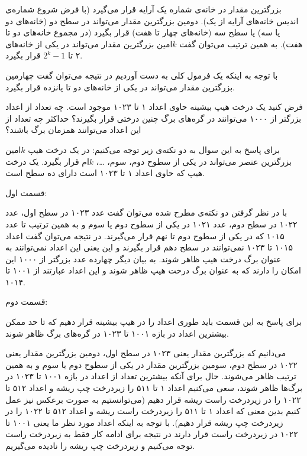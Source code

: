 بزرگترین مقدار در خانه‌ی شماره یک آرایه قرار می‌گیرد (با فرض شروع شماره‌ی اندیس خانه‌های آرایه از یک). دومین بزرگترین مقدار می‌تواند در سطح دو (خانه‌های دو یا سه) یا سطح سه (خانه‌های چهار تا هفت) قرار بگیرد (در مجموع خانه‌های دو تا هفت). به همین ترتیب می‌توان گفت {$k$}امین بزرگترین مقدار می‌تواند در یکی از خانه‌های ۲ تا {$2^k-1$} قرار بگیرد.

با توجه به اینکه یک فرمول کلی به دست آوردیم در نتیجه می‌توان گفت چهارمین بزرگترین مقدار می‌تواند در یکی از خانه‌های دو تا پانزده قرار بگیرد.

 فرض کنید یک درخت هیپ  بیشینه حاوی اعداد ۱ تا ۱۰۲۳ موجود است. چه تعداد از اعداد بزرگتر از ۱۰۰۰ می‌توانند در گره‌های برگ چنین درختی قرار بگیرند؟ حداکثر چه تعداد از این اعداد می‌توانند همزمان برگ باشند؟


برای پاسخ به این سوال به دو نکته‌ی زیر توجه می‌کنیم:
 در یک درخت هیپ {$k$}امین بزرگترین عنصر می‌تواند در یکی از سطوح دوم، سوم، {\ldots}، {$k$}ام قرار بگیرد.
  یک درخت هیپ که حاوی اعداد ۱ تا ۱۰۲۳ است دارای ده سطح است.

قسمت اول:

با در نظر گرفتن دو نکته‌ی مطرح شده می‌توان گفت عدد ۱۰۲۳ در سطح اول، عدد ۱۰۲۲ در سطح دوم، عدد ۱۰۲۱ در یکی از سطوح دوم یا سوم و به همین ترتیب تا عدد ۱۰۱۵ که در یکی از سطوح دوم تا نهم قرار می‌گیرند. در نتیجه می‌توان گفت اعداد ۱۰۱۵ تا ۱۰۲۳ نمی‌توانند در سطح دهم قرار بگیرند و این یعنی این اعداد نمی‌توانند به عنوان برگ درخت هیپ ظاهر شوند. به بیان دیگر چهارده عدد بزرگتر از ۱۰۰۰ این امکان را دارند که به عنوان برگ درخت هیپ ظاهر شوند و این اعداد عبارتند از ۱۰۰۱ تا ۱۰۱۴.

قسمت دوم:

برای پاسخ به این قسمت باید طوری اعداد را در هیپ بیشینه قرار دهیم که تا حد ممکن بیشترین اعداد در بازه ۱۰۰۱ تا ۱۰۲۳ در گره‌های برگ ظاهر شوند.

می‌دانیم که بزرگترین مقدار یعنی ۱۰۲۳ در سطح اول، دومین بزرگترین مقدار یعنی ۱۰۲۲ در سطح دوم، سومین بزرگترین مقدار در یکی از سطوح دوم یا سوم و به همین ترتیب ظاهر می‌شوند. حال برای آنکه بیشترین تعداد از اعداد در بازه ۱۰۰۱ تا ۱۰۲۳ در برگ‌ها ظاهر شوند، سعی می‌کنیم اعداد ۱ تا ۵۱۱ را زیردرخت چپ ریشه و اعداد ۵۱۲ تا ۱۰۲۲ را در زیردرخت راست ریشه قرار دهیم (می‌توانستیم به صورت برعکس نیز عمل کنیم بدین معنی که اعداد ۱ تا ۵۱۱ را زیردرخت راست ریشه و اعداد ۵۱۲ تا ۱۰۲۲ را در زیردرخت چپ ریشه قرار دهیم). با توجه به اینکه اعداد مورد نظر ما یعنی ۱۰۰۱ تا ۱۰۲۲ در زیردرخت راست قرار دارند در نتیجه برای ادامه کار فقط به زیردرخت راست توجه می‌کنیم و زیردرخت چپ ریشه را نادیده می‌گیریم. 


